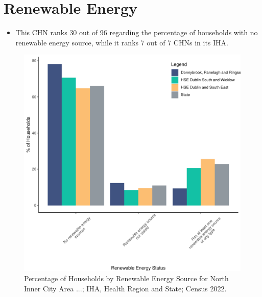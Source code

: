 \documentclass{article}
\begin{document}
\section{Renewable Energy}\label{sect:RE}
\begin{itemize}
\item This CHN ranks  30 out of 96 regarding the percentage of households with no renewable energy source, while it ranks   7 out of 7 CHNs in its IHA.
\end{itemize}
\begin{figure}[H]
	\centering
	\includegraphics[width = 140mm]{../figures/RenewableEnergyED.pdf}
	\caption{Percentage of Households by Renewable Energy Source for North Inner City Area ...; IHA, Health Region and State; Census 2022.}
	\label{fig:vbnv}
	\end{figure}
\end{document}

